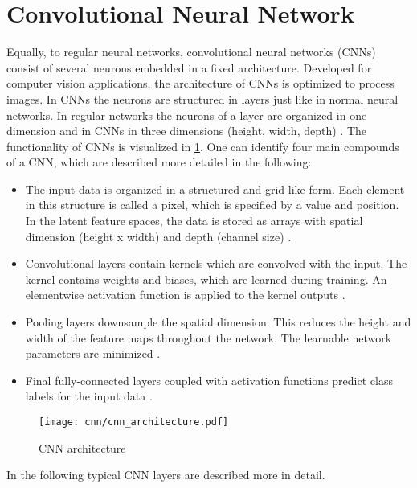 \section{Convolutional Neural Network}

Equally, to regular neural networks, convolutional neural networks (CNNs) consist of several neurons embedded in a fixed architecture. Developed for computer vision applications, the architecture of CNNs is optimized to process images. In CNNs the neurons are structured in layers just like in normal neural networks. In regular networks the neurons of a layer are organized in one dimension and in CNNs in three dimensions (height, width, depth) \cite{OShea2015}. The functionality of CNNs is visualized in \ref{fig:CNN_overview}. One can identify four main compounds of a CNN, which are described more detailed in the following:

\begin{itemize}
    \item [1.] The input data is organized in a structured and grid-like form. Each element in this structure is called a pixel, which is specified by a value and position. In the latent feature spaces, the data is stored as arrays with spatial dimension (height x width) and depth (channel size) \cite{OShea2015}.
    
    \item [2.] Convolutional layers contain kernels which are convolved with the input. The kernel contains weights and biases, which are learned during training. An elementwise activation function is applied to the kernel outputs \cite{OShea2015}.
    
    \item [3.]  Pooling layers downsample the spatial dimension. This reduces the height and width of the feature maps throughout the network. The learnable network parameters are minimized \cite{OShea2015}.
    
    \item [4.] Final fully-connected layers coupled with activation functions predict class labels for the input data \cite{OShea2015}.
\end{itemize}

\begin{figure}[H]
  \centering
  \texttt{[image: cnn/cnn\_architecture.pdf]}
  \caption {CNN architecture \cite{OShea2015}}
  \label{fig:CNN_overview}
\end{figure}

In the following typical CNN layers are described more in detail. 

